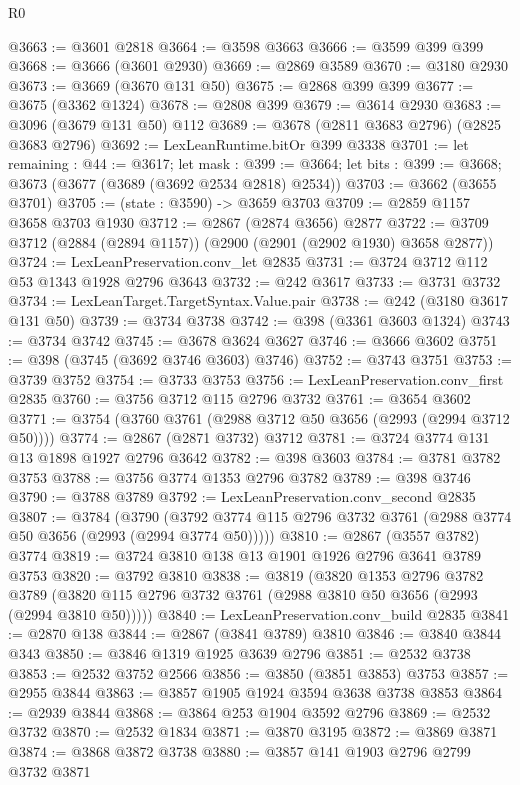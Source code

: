 \begin{lexlean}{R0}
\begin{coremodule}
@3663 := @3601 @2818
@3664 := @3598 @3663
@3666 := @3599 @399 @399
@3668 := @3666 (@3601 @2930)
@3669 := @2869 @3589
@3670 := @3180 @2930
@3673 := @3669 (@3670 @131 @50)
@3675 := @2868 @399 @399
@3677 := @3675 (@3362 @1324)
@3678 := @2808 @399
@3679 := @3614 @2930
@3683 := @3096 (@3679 @131 @50) @112
@3689 := @3678 (@2811 @3683 @2796) (@2825 @3683 @2796)
@3692 := LexLeanRuntime.bitOr @399 @3338
@3701 := let remaining : @44 := @3617;
  let mask : @399 := @3664;
  let bits : @399 := @3668; @3673 (@3677 (@3689 (@3692 @2534 @2818) @2534))
@3703 := @3662 (@3655 @3701)
@3705 := (state : @3590) -> @3659 @3703
@3709 := @2859 @1157 @3658 @3703 @1930
@3712 := @2867 (@2874 @3656) @2877
@3722 := @3709 @3712 (@2884 (@2894 @1157)) (@2900 (@2901 (@2902 @1930) @3658 @2877))
@3724 := LexLeanPreservation.conv_let @2835
@3731 := @3724 @3712 @112 @53 @1343 @1928 @2796 @3643
@3732 := @242 @3617
@3733 := @3731 @3732
@3734 := LexLeanTarget.TargetSyntax.Value.pair
@3738 := @242 (@3180 @3617 @131 @50)
@3739 := @3734 @3738
@3742 := @398 (@3361 @3603 @1324)
@3743 := @3734 @3742
@3745 := @3678 @3624 @3627
@3746 := @3666 @3602
@3751 := @398 (@3745 (@3692 @3746 @3603) @3746)
@3752 := @3743 @3751
@3753 := @3739 @3752
@3754 := @3733 @3753
@3756 := LexLeanPreservation.conv_first @2835
@3760 := @3756 @3712 @115 @2796 @3732
@3761 := @3654 @3602
@3771 := @3754 (@3760 @3761 (@2988 @3712 @50 @3656 (@2993 (@2994 @3712 @50))))
@3774 := @2867 (@2871 @3732) @3712
@3781 := @3724 @3774 @131 @13 @1898 @1927 @2796 @3642
@3782 := @398 @3603
@3784 := @3781 @3782 @3753
@3788 := @3756 @3774 @1353 @2796 @3782
@3789 := @398 @3746
@3790 := @3788 @3789
@3792 := LexLeanPreservation.conv_second @2835
@3807 := @3784
    (@3790 (@3792 @3774 @115 @2796 @3732 @3761 (@2988 @3774 @50 @3656 (@2993 (@2994 @3774 @50)))))
@3810 := @2867 (@3557 @3782) @3774
@3819 := @3724 @3810 @138 @13 @1901 @1926 @2796 @3641 @3789 @3753
@3820 := @3792 @3810
@3838 := @3819
    (@3820
      @1353
      @2796
      @3782
      @3789
      (@3820 @115 @2796 @3732 @3761 (@2988 @3810 @50 @3656 (@2993 (@2994 @3810 @50)))))
@3840 := LexLeanPreservation.conv_build @2835
@3841 := @2870 @138
@3844 := @2867 (@3841 @3789) @3810
@3846 := @3840 @3844 @343
@3850 := @3846 @1319 @1925 @3639 @2796
@3851 := @2532 @3738
@3853 := @2532 @3752 @2566
@3856 := @3850 (@3851 @3853) @3753
@3857 := @2955 @3844
@3863 := @3857 @1905 @1924 @3594 @3638 @3738 @3853
@3864 := @2939 @3844
@3868 := @3864 @253 @1904 @3592 @2796
@3869 := @2532 @3732
@3870 := @2532 @1834
@3871 := @3870 @3195
@3872 := @3869 @3871
@3874 := @3868 @3872 @3738
@3880 := @3857 @141 @1903 @2796 @2799 @3732 @3871

\end{coremodule}
\end{lexlean}
